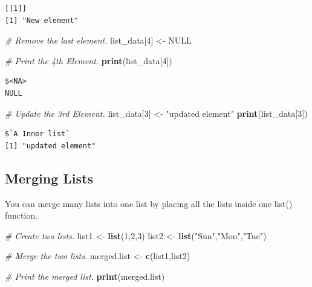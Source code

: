 \documentclass[]{book}
\newenvironment{Shaded}{\begin{snugshade}}{\end{snugshade}}
\newcommand{\CommentTok}[1]{\textcolor[rgb]{0.56,0.35,0.01}{\textit{#1}}}
\newcommand{\DecValTok}[1]{\textcolor[rgb]{0.00,0.00,0.81}{#1}}
\newcommand{\KeywordTok}[1]{\textcolor[rgb]{0.13,0.29,0.53}{\textbf{#1}}}
\newcommand{\NormalTok}[1]{#1}
\newcommand{\OtherTok}[1]{\textcolor[rgb]{0.56,0.35,0.01}{#1}}
\newcommand{\StringTok}[1]{\textcolor[rgb]{0.31,0.60,0.02}{#1}}
\theoremstyle{definition}
\theoremstyle{definition}
\theoremstyle{definition}
\theoremstyle{remark}
\begin{document}
\begin{verbatim}
[[1]]
[1] "New element"
\end{verbatim}

\begin{Shaded}
\begin{Highlighting}[]
\CommentTok{# Remove the last element.}
\NormalTok{list_data[}\DecValTok{4}\NormalTok{] <-}\StringTok{ }\OtherTok{NULL}

\CommentTok{# Print the 4th Element.}
\KeywordTok{print}\NormalTok{(list_data[}\DecValTok{4}\NormalTok{])}
\end{Highlighting}
\end{Shaded}

\begin{verbatim}
$<NA>
NULL
\end{verbatim}

\begin{Shaded}
\begin{Highlighting}[]
\CommentTok{# Update the 3rd Element.}
\NormalTok{list_data[}\DecValTok{3}\NormalTok{] <-}\StringTok{ "updated element"}
\KeywordTok{print}\NormalTok{(list_data[}\DecValTok{3}\NormalTok{])}
\end{Highlighting}
\end{Shaded}

\begin{verbatim}
$`A Inner list`
[1] "updated element"
\end{verbatim}

\hypertarget{merging-lists}{%
\subsection{Merging Lists}\label{merging-lists}}

You can merge many lists into one list by placing all the lists inside
one list() function.

\begin{Shaded}
\begin{Highlighting}[]
\CommentTok{# Create two lists.}
\NormalTok{list1 <-}\StringTok{ }\KeywordTok{list}\NormalTok{(}\DecValTok{1}\NormalTok{,}\DecValTok{2}\NormalTok{,}\DecValTok{3}\NormalTok{)}
\NormalTok{list2 <-}\StringTok{ }\KeywordTok{list}\NormalTok{(}\StringTok{"Sun"}\NormalTok{,}\StringTok{"Mon"}\NormalTok{,}\StringTok{"Tue"}\NormalTok{)}

\CommentTok{# Merge the two lists.}
\NormalTok{merged.list <-}\StringTok{ }\KeywordTok{c}\NormalTok{(list1,list2)}

\CommentTok{# Print the merged list.}
\KeywordTok{print}\NormalTok{(merged.list)}
\end{Highlighting}
\end{Shaded}
\end{document}
